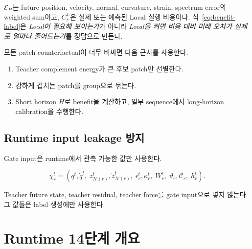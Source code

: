 \documentclass[11pt,a4paper]{article}
\begin{document}
\(\mathcal E_H\)는 future position, velocity, normal, curvature,
strain, spectrum error의 weighted sum이고,
\(C_r^L\)은 실제 또는 예측된 Local 실행 비용이다.
식~\eqref{eq:benefit-label}은 \emph{Local이 필요해 보이는가}가 아니라
\emph{Local을 켜면 비용 대비 미래 오차가 실제로 얼마나 줄어드는가}를 정답으로 만든다.

모든 patch counterfactual이 너무 비싸면 다음 근사를 사용한다.

\begin{enumerate}[leftmargin=1.7em]
  \item Teacher complement energy가 큰 후보 patch만 선별한다.
  \item 강하게 겹치는 patch를 group으로 묶는다.
  \item Short horizon \(H\)로 benefit을 계산하고,
  일부 sequence에서 long-horizon calibration을 수행한다.
\end{enumerate}

\subsection{Runtime input leakage 방지}

Gate input은 runtime에서 관측 가능한 값만 사용한다.

\begin{equation}
  \chi_r^t
  =
  \left(
  q^t,\dot q^t,\;
  z_{\mathcal N(r)}^t,\dot z_{\mathcal N(r)}^t,\;
  \epsilon_r^t,\kappa_r^t,\;
  W_r^t,\;
  \vartheta_r,\mathcal C_r,\;
  h_r^t
  \right).
\end{equation}

Teacher future state, teacher residual, teacher force를 gate input으로 넣지 않는다.
그 값들은 label 생성에만 사용한다.

\section{Runtime 14단계 개요}
\end{document}
